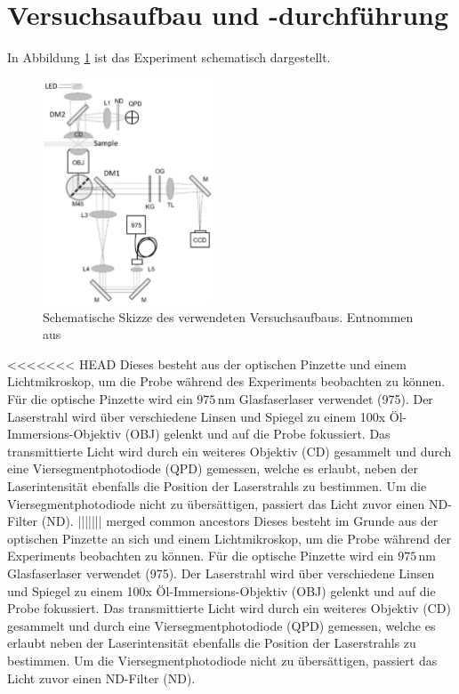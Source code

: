 \newpage
\section{Versuchsaufbau und -durchführung}
  In Abbildung \ref{fig:Aufbau} ist das Experiment schematisch dargestellt.
  \begin{figure}[h]
    \centering
    \includegraphics[width = 0.45\textwidth]{pictures/OPaufbau.png}
    \caption{Schematische Skizze des verwendeten Versuchsaufbaus. Entnommen aus \cite{tu_dortmund_versuchsanleitung_OptischePinzette}}
    \label{fig:Aufbau}
  \end{figure}
<<<<<<< HEAD
  Dieses besteht aus der optischen Pinzette und einem Lichtmikroskop, um die Probe während des Experiments beobachten zu können.
  Für die optische Pinzette wird ein $975\,\text{nm}$ Glasfaserlaser verwendet (975). Der Laserstrahl wird über verschiedene Linsen und Spiegel zu einem 100x Öl-Immersions-Objektiv (OBJ) gelenkt und auf die Probe fokussiert. Das transmittierte Licht wird durch ein weiteres Objektiv (CD) gesammelt und durch eine Viersegmentphotodiode (QPD) gemessen, welche es erlaubt, neben der Laserintensität ebenfalls die Position der Laserstrahls zu bestimmen. Um die Viersegmentphotodiode nicht zu übersättigen, passiert das Licht zuvor einen ND-Filter (ND).
||||||| merged common ancestors
  Dieses besteht im Grunde aus der optischen Pinzette an sich und einem Lichtmikroskop, um die Probe während der Experiments beobachten zu können.
  Für die optische Pinzette wird ein $975\,\text{nm}$ Glasfaserlaser verwendet (975). Der Laserstrahl wird über verschiedene Linsen und Spiegel zu einem 100x Öl-Immersions-Objektiv (OBJ) gelenkt und auf die Probe fokussiert. Das transmittierte Licht wird durch ein weiteres Objektiv (CD) gesammelt und durch eine Viersegmentphotodiode (QPD) gemessen, welche es erlaubt neben der Laserintensität ebenfalls die Position der Laserstrahls zu bestimmen. Um die Viersegmentphotodiode nicht zu übersättigen, passiert das Licht zuvor einen ND-Filter (ND).
